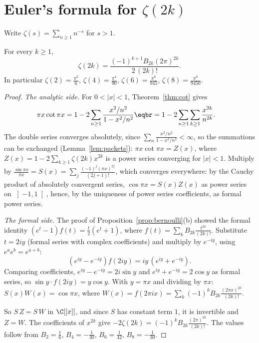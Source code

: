\section{Euler's formula for \texorpdfstring{$\zeta(2k)$}{zeta(2k)}}

Write $\zeta(s)=\sum_{n\ge1}n^{-s}$ for $s>1$.

\begin{theorem}[Euler, 1735--1740]\label{thm:zeta2k}
For every $k\ge1$,
\[
\zeta(2k)=\frac{(-1)^{k+1}B_{2k}(2\pi)^{2k}}{2\,(2k)!}.
\]
In particular $\zeta(2)=\frac{\pi^2}6$, $\zeta(4)=\frac{\pi^4}{90}$, $\zeta(6)=\frac{\pi^6}{945}$, $\zeta(8)=\frac{\pi^8}{9450}$.
\end{theorem}
\begin{proof}
\emph{The analytic side.} For $0<|x|<1$, Theorem~\ref{thm:cot} gives
\[
\begin{aligned}\pi x\cot\pi x&=1-2\sum_{n\ge1}\frac{x^2/n^2}{1-x^2/n^2}\eqbr=1-2\sum_{n\ge1}\sum_{k\ge1}\frac{x^{2k}}{n^{2k}}.\end{aligned}
\]
The double series converges absolutely, since $\sum_n\frac{x^2/n^2}{1-x^2/n^2}<\infty$, so the summations can be exchanged
(Lemma~\ref{lem:packets}): $\pi x\cot\pi x=Z(x)$, where $Z(x)=1-2\sum_{k\ge1}\zeta(2k)x^{2k}$ is a power series converging for
$|x|<1$. Multiply by $\frac{\sin\pi x}{\pi x}=S(x)=\sum_j\frac{(-1)^j(\pi x)^{2j}}{(2j+1)!}$, which converges everywhere: by the
Cauchy product of absolutely convergent series, $\cos\pi x=S(x)Z(x)$ as power series on $\left]-1,1\right[$, hence, by the
uniqueness of power series coefficients, as formal power series.

\emph{The formal side.} The proof of Proposition~\ref{prop:bernoulli}(b) showed the formal identity
$(e^t-1)f(t)=\frac t2(e^t+1)$, where $f(t)=\sum_kB_{2k}\frac{t^{2k}}{(2k)!}$. Substitute $t=2iy$ (formal series with complex
coefficients) and multiply by $e^{-iy}$, using $e^{a}e^{b}=e^{a+b}$:
\[
(e^{iy}-e^{-iy})f(2iy)=iy\,(e^{iy}+e^{-iy}).
\]
Comparing coefficients, $e^{iy}-e^{-iy}=2i\sin y$ and $e^{iy}+e^{-iy}=2\cos y$ as formal series, so
$\sin y\cdot f(2iy)=y\cos y$. With $y=\pi x$ and dividing by $\pi x$: $S(x)W(x)=\cos\pi x$, where
$W(x)=f(2\pi ix)=\sum_k(-1)^kB_{2k}\frac{(2\pi x)^{2k}}{(2k)!}$.

So $S\,Z=S\,W$ in $\C[[x]]$, and since $S$ has constant term $1$, it is invertible and $Z=W$. The coefficients of $x^{2k}$ give
$-2\zeta(2k)=(-1)^kB_{2k}\frac{(2\pi)^{2k}}{(2k)!}$. The values follow from $B_2=\frac16$, $B_4=-\frac1{30}$, $B_6=\frac1{42}$, $B_8=-\frac1{30}$.
\end{proof}

